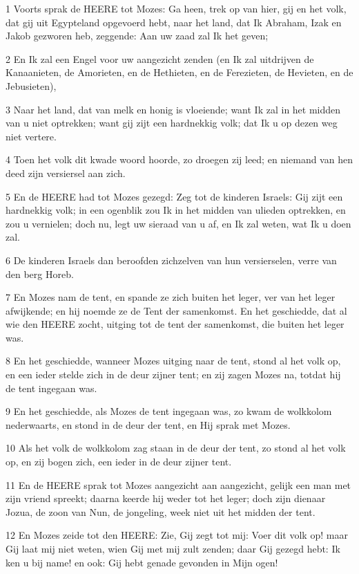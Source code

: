 \par 1 Voorts sprak de HEERE tot Mozes: Ga heen, trek op van hier, gij en het volk, dat gij uit Egypteland opgevoerd hebt, naar het land, dat Ik Abraham, Izak en Jakob gezworen heb, zeggende: Aan uw zaad zal Ik het geven;
\par 2 En Ik zal een Engel voor uw aangezicht zenden (en Ik zal uitdrijven de Kanaanieten, de Amorieten, en de Hethieten, en de Ferezieten, de Hevieten, en de Jebusieten),
\par 3 Naar het land, dat van melk en honig is vloeiende; want Ik zal in het midden van u niet optrekken; want gij zijt een hardnekkig volk; dat Ik u op dezen weg niet vertere.
\par 4 Toen het volk dit kwade woord hoorde, zo droegen zij leed; en niemand van hen deed zijn versiersel aan zich.
\par 5 En de HEERE had tot Mozes gezegd: Zeg tot de kinderen Israels: Gij zijt een hardnekkig volk; in een ogenblik zou Ik in het midden van ulieden optrekken, en zou u vernielen; doch nu, legt uw sieraad van u af, en Ik zal weten, wat Ik u doen zal.
\par 6 De kinderen Israels dan beroofden zichzelven van hun versierselen, verre van den berg Horeb.
\par 7 En Mozes nam de tent, en spande ze zich buiten het leger, ver van het leger afwijkende; en hij noemde ze de Tent der samenkomst. En het geschiedde, dat al wie den HEERE zocht, uitging tot de tent der samenkomst, die buiten het leger was.
\par 8 En het geschiedde, wanneer Mozes uitging naar de tent, stond al het volk op, en een ieder stelde zich in de deur zijner tent; en zij zagen Mozes na, totdat hij de tent ingegaan was.
\par 9 En het geschiedde, als Mozes de tent ingegaan was, zo kwam de wolkkolom nederwaarts, en stond in de deur der tent, en Hij sprak met Mozes.
\par 10 Als het volk de wolkkolom zag staan in de deur der tent, zo stond al het volk op, en zij bogen zich, een ieder in de deur zijner tent.
\par 11 En de HEERE sprak tot Mozes aangezicht aan aangezicht, gelijk een man met zijn vriend spreekt; daarna keerde hij weder tot het leger; doch zijn dienaar Jozua, de zoon van Nun, de jongeling, week niet uit het midden der tent.
\par 12 En Mozes zeide tot den HEERE: Zie, Gij zegt tot mij: Voer dit volk op! maar Gij laat mij niet weten, wien Gij met mij zult zenden; daar Gij gezegd hebt: Ik ken u bij name! en ook: Gij hebt genade gevonden in Mijn ogen!
